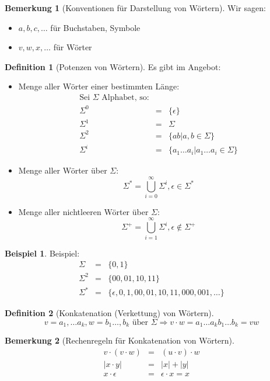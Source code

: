 \documentclass[11pt]{article} %
\theoremstyle{definition}
\newtheorem*{beispiel}{Beispiel}
\newtheorem{definition}{Definition}
\newtheorem*{bemerkung}{Bemerkung}
\begin{document}
\begin{bemerkung}[Konventionen für Darstellung von Wörtern]
Wir sagen:
\begin{itemize}
\item $a,b,c,\dots$ für Buchstaben, Symbole
\item $v,w,x,\dots$ für Wörter
\end{itemize}
\end{bemerkung}

\begin{definition}[Potenzen von Wörtern]
Es gibt im Angebot:
\begin{itemize}
\item Menge aller Wörter einer bestimmten Länge:
\begin{eqnarray*}
\textrm{Sei $\Sigma$ Alphabet, so:} && \\
 \Sigma^0 &=& \{\epsilon\} \\
 \Sigma^1 &=& \Sigma \\
\Sigma^2 &=& \{ ab | a,b \in \Sigma\} \\
\Sigma^i &=& \{ a_1\dots a_i | a_1 \dots a_i \in \Sigma \}
\end{eqnarray*}
\item Menge aller Wörter über $\Sigma$: \[
\Sigma^* = \bigcup\limits_{i = 0}^{\infty} \Sigma^i, \epsilon \in \Sigma^*
\]
\item Menge aller nichtleeren Wörter über $\Sigma$: \[
\Sigma^+ = \bigcup\limits_{i = 1}^{\infty} \Sigma^i, \epsilon \notin \Sigma^+
\]
\end{itemize}
\end{definition}
\begin{beispiel}
\item Beispiel: \begin{eqnarray*}
\Sigma &=& \{0,1\} \\
\Sigma^2 &=& \{00, 01, 10, 11\} \\
\Sigma^* &=& \{\epsilon, 0, 1, 00, 01, 10, 11, 000, 001, \dots \}
\end{eqnarray*}
\end{beispiel}

\begin{definition}[Konkatenation (Verkettung) von Wörtern]
\[
v = a_1,\dots a_k, w = b_1\dots,b_k \textrm{ über } \Sigma \Rightarrow v\cdot w = a_1\dots a_kb_1\dots b_k = vw
\]
\end{definition}

\begin{bemerkung}[Rechenregeln für Konkatenation von Wörtern]
\begin{eqnarray*}
v\cdot(v\cdot w) &=& (u\cdot v)\cdot w \\
|x\cdot y| &=& |x| + |y| \\
x\cdot\epsilon&=&\epsilon\cdot x =  x
\end{eqnarray*}
\end{bemerkung}
\end{document}
